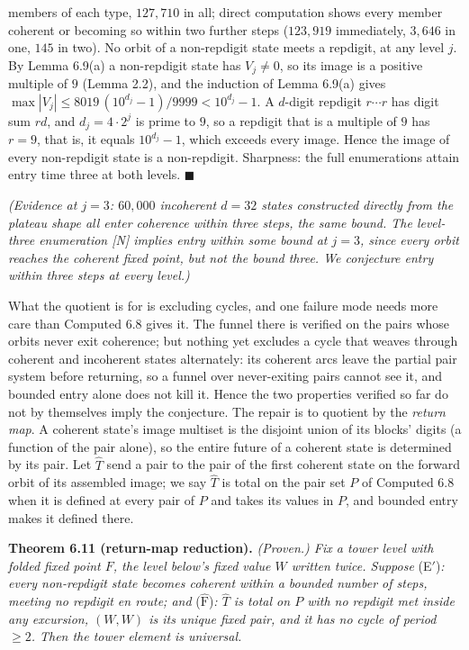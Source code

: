 \documentclass[11pt,letterpaper]{article}
\theoremstyle{paperstyle}
\theoremstyle{paperstyledef}
\theoremstyle{paperstylerem}
\begin{document}
members of each type, \(127{,}710\) in all; direct computation shows every member coherent or becoming so within two further steps (\(123{,}919\) immediately, \(3{,}646\) in one, \(145\) in two). No orbit of a non-repdigit state meets a repdigit, at any level \(j\). By Lemma 6.9(a) a non-repdigit state has \(V_j \neq 0\), so its image is a positive multiple of \(9\) (Lemma 2.2), and the induction of Lemma 6.9(a) gives \(\max|V_j| \leq 8019\,(10^{d_j} - 1)/9999 < 10^{d_j} - 1\). A \(d\)-digit repdigit \(r \cdots r\) has digit sum \(rd\), and \(d_j = 4 \cdot 2^j\) is prime to \(9\), so a repdigit that is a multiple of \(9\) has \(r = 9\), that is, it equals \(10^{d_j} - 1\), which exceeds every image. Hence the image of every non-repdigit state is a non-repdigit. Sharpness: the full enumerations attain entry time three at both levels. \(\blacksquare\)

\emph{(Evidence at \(j = 3\): \(60{,}000\) incoherent \(d = 32\) states constructed directly from the plateau shape all enter coherence within three steps, the same bound. The level-three enumeration {[}N{]} implies entry within some bound at \(j = 3\), since every orbit reaches the coherent fixed point, but not the bound three. We conjecture entry within three steps at every level.)}

What the quotient is for is excluding cycles, and one failure mode needs more care than Computed 6.8 gives it. The funnel there is verified on the pairs whose orbits never exit coherence; but nothing yet excludes a cycle that weaves through coherent and incoherent states alternately: its coherent arcs leave the partial pair system before returning, so a funnel over never-exiting pairs cannot see it, and bounded entry alone does not kill it. Hence the two properties verified so far do not by themselves imply the conjecture. The repair is to quotient by the \emph{return map}. A coherent state's image multiset is the disjoint union of its blocks' digits (a function of the pair alone), so the entire future of a coherent state is determined by its pair. Let \(\widehat{T}\) send a pair to the pair of the first coherent state on the forward orbit of its assembled image; we say \(\widehat{T}\) is total on the pair set \(P\) of Computed 6.8 when it is defined at every pair of \(P\) and takes its values in \(P\), and bounded entry makes it defined there.

\textbf{Theorem 6.11 (return-map reduction).} \emph{(Proven.) Fix a tower level with folded fixed point \(F\), the level below's fixed value \(W\) written twice. Suppose} (E\('\))\emph{: every non-repdigit state becomes coherent within a bounded number of steps, meeting no repdigit en route; and} (\(\widehat{\mathrm{F}}\))\emph{: \(\widehat{T}\) is total on \(P\) with no repdigit met inside any excursion, \((W, W)\) is its unique fixed pair, and it has no cycle of period \(\geq 2\). Then the tower element is universal.}
\end{document}
